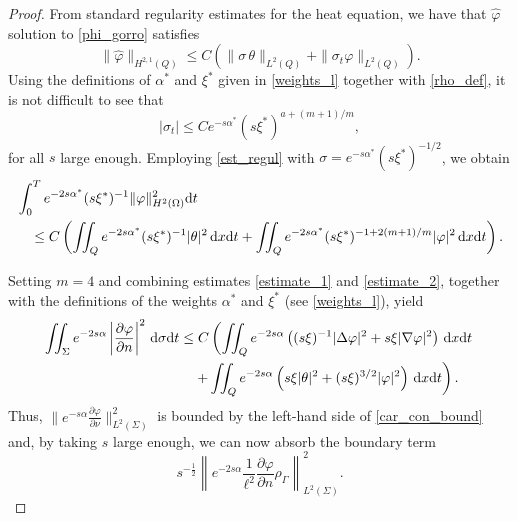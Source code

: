 \documentclass{dcds-bOF}
\theoremstyle{definition}
\def\csbd{\rho_{\Gamma}}
\def\dx{\,\textnormal{d}x}
\def\dt{\textnormal{d}t}
\def\d{\,\textnormal{d}}
\begin{document}
\begin{proof}
From standard regularity estimates for the heat equation, we have that $\widehat{\varphi}$ solution to \eqref{phi_gorro} satisfies
%
\begin{equation}\label{est_regul}
\|\widehat{\varphi}\|_{H^{2,1}(Q)}\leq C\left(\|\sigma\,\theta\|_{L^2(Q)}+\|\sigma_t\varphi\|_{L^2(Q)}\right).
\end{equation}
%
Using the definitions of $\alpha^*$ and $\xi^*$ given in \eqref{weights_l} together with \eqref{rho_def}, it is not difficult to see that
%
\begin{equation*}
|\sigma_t|\leq Ce^{-s\alpha^*}(s\xi^*)^{a+{(m+1)}/{m}},
\end{equation*}
%
for all $s$ large enough. Employing  \eqref{est_regul} with $\sigma=e^{-s\alpha^*}(s\xi^*)^{-1/2}$, we obtain
%
\begin{equation}\label{estimate_2}
\begin{split}
&\int_{0}^T e^{-2s\alpha^*}(s\xi^{*})^{-1}\|\varphi\|_{H^2(\Omega)}^2\dt \\
&\quad \leq C\left(\iint_Qe^{-2s\alpha^*}(s\xi^*)^{-1}|\theta|^2\dx\dt+\iint_Qe^{-2s\alpha^*}(s\xi^*)^{-1+2(m+1)/m}|\varphi|^2\dx\dt\right).
\end{split}
\end{equation}

Setting $m=4$ and combining estimates \eqref{estimate_1} and \eqref{estimate_2}, together with the definitions of the weights $\alpha^*$ and $\xi^*$ (see \eqref{weights_l}), yield
%
\begin{equation*}
\begin{split}
\iint_{\Sigma}e^{-2s\alpha}\left|\frac{\partial \varphi}{\partial n}\right|^2\d\sigma\dt
&\leq C\left(\iint_Q e^{-2s\alpha}\left((s\xi)^{-1}|\Delta \varphi|^2 + s\xi|\nabla \varphi|^2\right)\dx\dt \right.\\
&\quad \left.+\iint_Qe^{-2s\alpha}\left(s\xi|\theta|^2+(s\xi)^{3/2}|\varphi|^2\right)\dx\dt\right).
\end{split}
\end{equation*}
%
Thus, $\|e^{-s\alpha}\frac{\partial \varphi}{\partial \nu}\|_{L^2(\Sigma)}^2$ is bounded by the left-hand side of \eqref{car_con_bound} and, by taking $s$ large enough, we can now absorb the boundary term
%
\begin{equation*}
s^{-\frac{1}{2}}\left\| e^{-2s\alpha} \frac{1}{\ell^2}\frac{\partial \varphi}{\partial n} \csbd \right\|^{2}_{L^2(\Sigma)}.
\end{equation*}


\end{proof}
\end{document}
